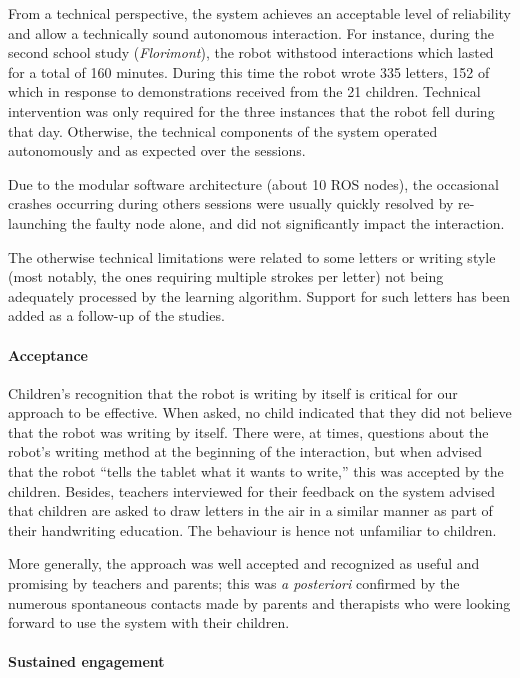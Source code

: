 \documentclass{article}
\begin{document}
From a technical perspective, the system achieves an acceptable level of
reliability and allow a technically sound autonomous interaction. For instance,
during the second school study (\textit{Florimont}), the robot withstood
interactions which lasted for a total of 160 minutes.  During this time the
robot wrote 335 letters, 152 of which in response to demonstrations received
from the 21 children. Technical intervention was only required for the three
instances that the robot fell during that day.  Otherwise, the technical
components of the system operated autonomously and as expected over the
sessions.

Due to the modular software architecture (about 10 ROS nodes), the occasional
crashes occurring during others sessions were usually quickly resolved by
re-launching the faulty node alone, and did not significantly impact the
interaction.

The otherwise technical limitations were related to some letters or writing
style (most notably, the ones requiring multiple strokes per letter) not being
adequately processed by the learning algorithm. Support for such letters has
been added as a follow-up of the studies.

\paragraph{Acceptance}

Children's recognition that the robot is writing by itself is critical for our
approach to be effective. When asked, no child indicated that they did not
believe that the robot was writing by itself. There were, at times, questions
about the robot's writing method at the beginning of the interaction, but when
advised that the robot ``tells the tablet what it wants to write,'' this was
accepted by the children.  Besides, teachers interviewed for their feedback on
the system advised that children are asked to draw letters in the air in a
similar manner as part of their handwriting education. The behaviour is hence
not unfamiliar to children.

More generally, the approach was well accepted and recognized as useful and
promising by teachers and parents; this was \textit{a posteriori} confirmed by
the numerous spontaneous contacts made by parents and therapists who were
looking forward to use the system with their children.

\paragraph{Sustained engagement}
\end{document}
